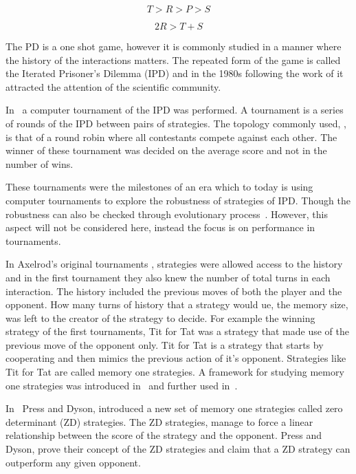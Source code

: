 \documentclass[10pt]{article}
\begin{document}
\begin{equation}\label{eq:pd_constrain_one}
    T > R > P > S 
\end{equation}

\begin{equation}\label{eq:pd_constrain_two}
    2R > T + S
\end{equation}

The PD is a one shot game, however it is commonly studied in a manner where the
history of the interactions matters. The repeated form of the game is called the
Iterated Prisoner's Dilemma (IPD) and in the 1980s following the work of
\cite{Axelrod1980a, Axelrod1980b} it attracted the attention of the scientific
community.

In~\cite{Axelrod1980a} a computer tournament of the IPD was performed. A
tournament is a series of rounds of the IPD between pairs of strategies. The
topology commonly used, \cite{Axelrod1980a, Axelrod1980b}, is that of a round
robin where all contestants compete against each other. The winner of these
tournament was decided on the average score and not in the number of wins.

These tournaments were the milestones of an era which to today is using
computer tournaments to explore the robustness of strategies of IPD. Though
the robustness can also be checked through evolutionary process~\cite{Nowak}.
However, this aspect will not be considered here, instead the focus is on
performance in tournaments.

In Axelrod's original tournaments \cite{Axelrod1980a, Axelrod1980b}, strategies
were allowed access to the history and in the first tournament they also knew
the number of total turns in each interaction. The history included the
previous moves of both the player and the opponent. How many turns of history
that a strategy would ue, the memory size, was left to the creator of the
strategy to decide. For example the winning strategy of the first tournaments,
Tit for Tat was a strategy that made use of the previous move of the opponent
only. Tit for Tat is a strategy that starts by cooperating and then mimics the
previous action of it's opponent. Strategies like Tit for Tat are called memory
one strategies. A framework for studying memory one strategies was introduced
in~\cite{Nowak1989} and further used in~\cite{Nowak1993, Nowak1990}.

In~\cite{Press2012} Press and Dyson, introduced a new set of memory one
strategies called zero determinant (ZD) strategies. The ZD strategies,
manage to force a linear relationship between the score of the strategy
and the opponent. Press and Dyson, prove their concept of the ZD strategies
and claim that a ZD strategy can outperform any given opponent.
\end{document}
